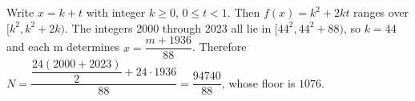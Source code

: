 Write $x=k+t$ with integer $k\ge 0$, $0\le t<1$. Then $f(x)=k^2+2kt$ ranges over $[k^2,k^2+2k)$. The integers 2000 through 2023 all lie in $[44^2,44^2+88)$, so $k=44$ and each m determines $x=\dfrac{m+1936}{88}$. Therefore $N=\dfrac{\dfrac{24(2000+2023)}{2}+24\cdot 1936}{88}=\dfrac{94740}{88}$, whose floor is $\boxed{1076}$.
